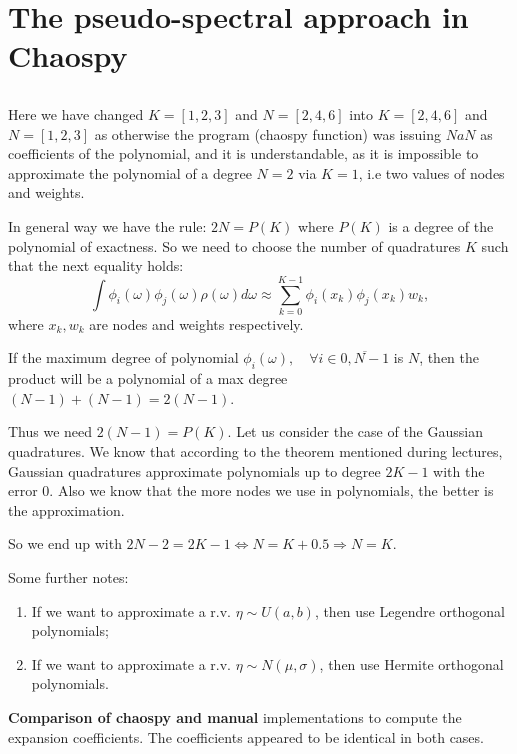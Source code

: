 \documentclass[11pt]{article}
\newcommand{\subass}{\subsection{}}
\begin{document}
\section{The pseudo-spectral approach in Chaospy}
\subass
Here we have changed $K = [1,2,3]$ and $N = [2,4,6]$ into $K = [2,4,6]$ and $N = [1,2,3]$ as otherwise the program (chaospy function) was issuing $NaN$ as coefficients of the polynomial, and it is understandable, as it is impossible to approximate the polynomial of a degree $N=2$ via $K = 1$, i.e two values of nodes and weights.

In general way we have the rule: $2N =  P(K)$ where $P(K)$ is a degree of the polynomial of exactness.
So we need to choose the number of quadratures $K$ such that the next equality holds:
$$ \int \phi_i(\omega) \phi_j(\omega) \rho(\omega) d\omega \approx \sum_{k=0}^{K -1} \phi_i(x_k) \phi_j(x_k) w_k, $$
where $x_k, w_k$ are nodes and weights respectively.

If the maximum degree of polynomial $\phi_i(\omega), \quad \forall i \in \overline{0, N-1}$ is $N$, then the product will be a polynomial of a max degree $(N-1)+ (N-1)  =2(N-1)$.

Thus we need $2(N-1) = P(K)$. Let us consider the case of the Gaussian quadratures. We know that according to the theorem mentioned during lectures, Gaussian quadratures approximate polynomials up to degree $2K - 1$ with the error $0$. Also we know that the more nodes we use in polynomials, the better is the approximation.

So we end up with $2N - 2  =2K -1 \iff N = K + 0.5 \Rightarrow N=K. $

Some further notes:
\begin{enumerate}
    \item If we want to approximate a r.v. $\eta \sim U(a,b)$, then use Legendre orthogonal polynomials;
    \item If we want to approximate a r.v. $\eta \sim N(\mu,\sigma)$, then use Hermite orthogonal polynomials.
\end{enumerate}

\textbf{Comparison of chaospy and manual} implementations to compute the expansion coefficients. The coefficients appeared to be identical in both cases.\\
\end{document}
